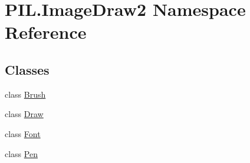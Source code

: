 \hypertarget{namespacePIL_1_1ImageDraw2}{}\section{P\+I\+L.\+Image\+Draw2 Namespace Reference}
\label{namespacePIL_1_1ImageDraw2}
\subsection*{Classes}
\begin{DoxyCompactItemize}
\item 
class \hyperlink{classPIL_1_1ImageDraw2_1_1Brush}{Brush}
\item 
class \hyperlink{classPIL_1_1ImageDraw2_1_1Draw}{Draw}
\item 
class \hyperlink{classPIL_1_1ImageDraw2_1_1Font}{Font}
\item 
class \hyperlink{classPIL_1_1ImageDraw2_1_1Pen}{Pen}
\end{DoxyCompactItemize}
